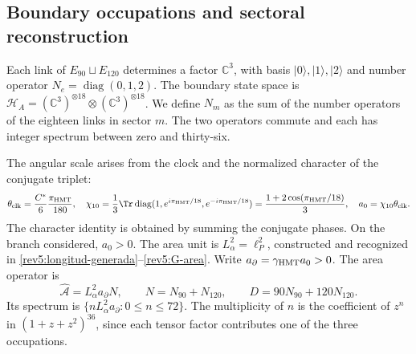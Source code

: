 

\subsection{Boundary occupations and sectoral reconstruction}

Each link of \(E_{90}\sqcup E_{120}\) determines a factor
\(\mathbb C^3\), with basis \(|0\rangle,|1\rangle,|2\rangle\)
and number operator \(N_e=\operatorname{diag}(0,1,2)\). The boundary
state space is
\(\mathscr H_A=(\mathbb C^3)^{\otimes18}\otimes
(\mathbb C^3)^{\otimes18}\). We define \(N_m\) as the sum of
the number operators of the eighteen links in sector \(m\).
The two operators commute and each has integer spectrum between
zero and thirty-six.

The angular scale arises from the clock and the normalized character of the
conjugate triplet:
\begin{equation}
 \theta_{\rm clk}=\frac{C^*}{6}\frac{\pi_{\rm HMT}}{180},
 \quad
 \chi_{10}=\frac13\Tr\operatorname{diag}
 (1,e^{i\pi_{\rm HMT}/18},e^{-i\pi_{\rm HMT}/18})
 =\frac{1+2\cos(\pi_{\rm HMT}/18)}3,
 \quad a_0=\chi_{10}\theta_{\rm clk}.
 \label{rev4:ae:escala}
\end{equation}
The character identity is obtained by summing the conjugate phases.
On the branch considered, \(a_0>0\). The area unit is
\(L_\alpha^2=\ell_P^2\), constructed and recognized in
\eqref{rev5:longitud-generada}--\eqref{rev5:G-area}. Write
\(a_\partial=\gamma_{\rm HMT}a_0>0\). The area operator is
\begin{equation}
 \widehat{\mathcal A}=L_\alpha^2a_\partial N,
 \qquad N=N_{90}+N_{120},
 \qquad D=90N_{90}+120N_{120}.
 \label{rev4:ae:area}
\end{equation}
Its spectrum is \(\{nL_\alpha^2a_\partial:0\le n\le72\}\).
The multiplicity of \(n\) is the coefficient of \(z^n\) in
\((1+z+z^2)^{36}\), since each tensor factor contributes one of
the three occupations.

